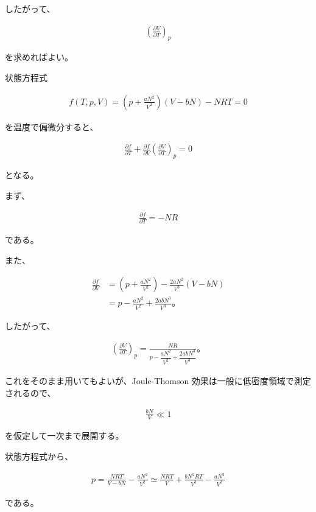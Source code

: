 \documentclass[platex,dvipdfmx,a4paper]{jsarticle}
\begin{document}
したがって、

\begin{align*}
\left(
\frac{\partial V}{\partial T}
\right)_p
\end{align*}

を求めればよい。

状態方程式

\begin{align*}
f(T,p,V)
=
\left(
p+\frac{aN^2}{V^2}
\right)
(V-bN)
-NRT
=
0
\end{align*}

を温度で偏微分すると、

\begin{align*}
\frac{\partial f}{\partial T}
+
\frac{\partial f}{\partial V}
\left(
\frac{\partial V}{\partial T}
\right)_p
=
0
\end{align*}

となる。

まず、

\begin{align*}
\frac{\partial f}{\partial T}
=
-NR
\end{align*}

である。

また、

\begin{align*}
\frac{\partial f}{\partial V}
&=
\left(
p+\frac{aN^2}{V^2}
\right)
-\frac{2aN^2}{V^3}(V-bN) \\
&=
p-\frac{aN^2}{V^2}
+\frac{2abN^3}{V^3}。
\end{align*}

したがって、

\begin{align*}
\left(
\frac{\partial V}{\partial T}
\right)_p
=
\frac{NR}
{
p-\dfrac{aN^2}{V^2}
+\dfrac{2abN^3}{V^3}
}。
\end{align*}

これをそのまま用いてもよいが、Joule-Thomson 効果は一般に低密度領域で測定されるので、

\begin{align*}
\frac{bN}{V}
\ll 1
\end{align*}

を仮定して一次まで展開する。

状態方程式から、

\begin{align*}
p
=
\frac{NRT}{V-bN}
-\frac{aN^2}{V^2}
\simeq
\frac{NRT}{V}
+
\frac{bN^2RT}{V^2}
-\frac{aN^2}{V^2}
\end{align*}

である。
\end{document}
